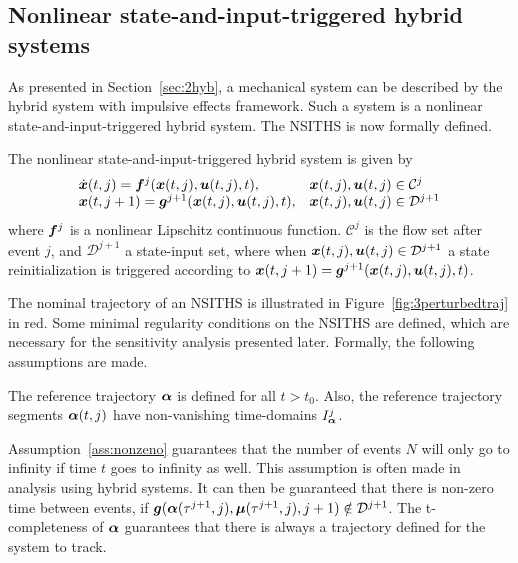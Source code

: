 \documentclass[../DC2017114Bouma.tex]{subfiles}
\begin{document}
\subsection{Nonlinear state-and-input-triggered hybrid systems}
As presented in Section~\ref{sec:2hyb}, a mechanical system can be described by the hybrid system with impulsive effects framework. Such a system is a nonlinear state-and-input-triggered hybrid system. The NSITHS is now formally defined.

\begin{mydef}[NSITHS]\label{def:3nsiths}
The nonlinear state-and-input-triggered hybrid system is given by
\begin{equation}
\begin{array}{ll}
\dot{{\boldsymbol{x}}}(t,j) ={\boldsymbol{f}}^j({\boldsymbol{x}}(t,j),{\boldsymbol{u}}(t,j),t),& {\boldsymbol{x}}(t,j),{\boldsymbol{u}}(t,j)\in \mathcal{C}^j\\
{\boldsymbol{x}}(t,j+1) = {\boldsymbol{g}}^{j+1}({\boldsymbol{x}}(t,j),{\boldsymbol{u}}(t,j),t),& {\boldsymbol{x}}(t,j),{\boldsymbol{u}}(t,j)\in \mathcal{D}^{j+1}
\end{array}\label{eq:3hybimp}
\end{equation}
where ${\boldsymbol{f}}^j$ is a nonlinear Lipschitz continuous function. $\mathcal{C}^j$ is the flow set after event $j$, and $\mathcal{D}^{j+1}$ a state-input set, where when ${\boldsymbol{x}}(t,j),{\boldsymbol{u}}(t,j)\in \mathcal{D}^{j+1}$ a state reinitialization is triggered according to ${\boldsymbol{x}}(t,j+1) = {\boldsymbol{g}}^{j+1}({\boldsymbol{x}}(t,j),{\boldsymbol{u}}(t,j),t)$.
\end{mydef} 

The nominal trajectory of an NSITHS is illustrated in Figure~\ref{fig:3perturbedtraj} in red. Some minimal regularity conditions on the NSITHS are defined, which are necessary for the sensitivity analysis presented later. Formally, the following assumptions are made.

\begin{myass}
The reference trajectory $\boldsymbol{\alpha}$ is defined for all $t>t_0$. Also, the reference trajectory segments $\boldsymbol{\alpha}(t,j)$ have non-vanishing time-domains $I_{\boldsymbol{\alpha}}^j$.\label{ass:nonzeno}
\end{myass}

Assumption~\ref{ass:nonzeno} guarantees that the number of events $N$ will only go to infinity if time $t$ goes to infinity as well. This assumption is often made in analysis using hybrid systems. It can then be guaranteed that there is non-zero time between events, if ${\boldsymbol{g}}(\boldsymbol{\alpha}(\tau^{j+1},j),\boldsymbol{\mu}(\tau^{j+1},j),j+1)\notin \mathcal{D}^{j+1}$. The t-completeness of $\boldsymbol{\alpha}$ guarantees that there is always a trajectory defined for the system to track.
\end{document}

